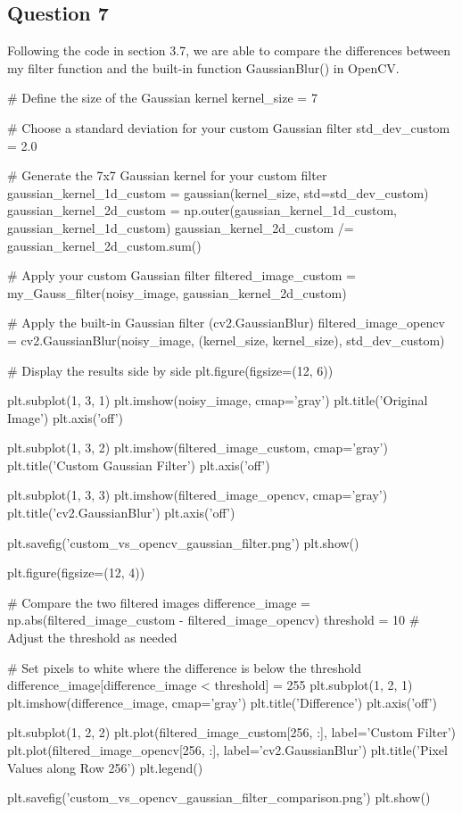 \documentclass[12pt]{article}
\begin{document}
\subsection{Question 7}
\quad Following the code in section 3.7, we are able to compare the differences between my filter function and the built-in function GaussianBlur() in OpenCV.
\begin{python}
# Define the size of the Gaussian kernel
kernel_size = 7

# Choose a standard deviation for your custom Gaussian filter
std_dev_custom = 2.0

# Generate the 7x7 Gaussian kernel for your custom filter
gaussian_kernel_1d_custom = gaussian(kernel_size, std=std_dev_custom)
gaussian_kernel_2d_custom = np.outer(gaussian_kernel_1d_custom, gaussian_kernel_1d_custom)
gaussian_kernel_2d_custom /= gaussian_kernel_2d_custom.sum()

# Apply your custom Gaussian filter
filtered_image_custom = my_Gauss_filter(noisy_image, gaussian_kernel_2d_custom)

# Apply the built-in Gaussian filter (cv2.GaussianBlur)
filtered_image_opencv = cv2.GaussianBlur(noisy_image, (kernel_size, kernel_size), std_dev_custom)

# Display the results side by side
plt.figure(figsize=(12, 6))

plt.subplot(1, 3, 1)
plt.imshow(noisy_image, cmap='gray')
plt.title('Original Image')
plt.axis('off')

plt.subplot(1, 3, 2)
plt.imshow(filtered_image_custom, cmap='gray')
plt.title('Custom Gaussian Filter')
plt.axis('off')

plt.subplot(1, 3, 3)
plt.imshow(filtered_image_opencv, cmap='gray')
plt.title('cv2.GaussianBlur')
plt.axis('off')

plt.savefig('custom_vs_opencv_gaussian_filter.png')
plt.show()

plt.figure(figsize=(12, 4))

# Compare the two filtered images
difference_image = np.abs(filtered_image_custom - filtered_image_opencv)
threshold = 10  # Adjust the threshold as needed

# Set pixels to white where the difference is below the threshold
difference_image[difference_image < threshold] = 255
plt.subplot(1, 2, 1)
plt.imshow(difference_image, cmap='gray')
plt.title('Difference')
plt.axis('off')

plt.subplot(1, 2, 2)
plt.plot(filtered_image_custom[256, :], label='Custom Filter')
plt.plot(filtered_image_opencv[256, :], label='cv2.GaussianBlur')
plt.title('Pixel Values along Row 256')
plt.legend()

plt.savefig('custom_vs_opencv_gaussian_filter_comparison.png')
plt.show()

\end{python}
\end{document}
